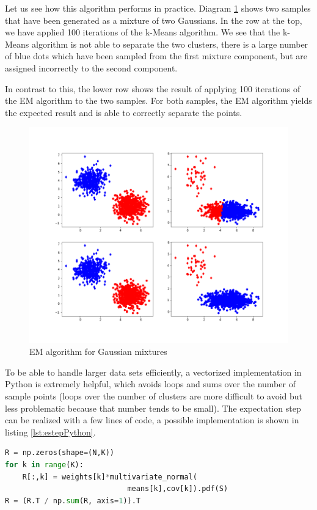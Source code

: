 \documentclass[a4paper, draft]{article}
\theoremstyle{own}
\theoremstyle{remark}
\begin{document}
Let us see how this algorithm performs in practice. Diagram \ref{fig:GMM} shows two samples that have been generated as a mixture of two Gaussians. In the row at the top, we have applied 100 iterations of the k-Means algorithm. We see that the k-Means algorithm is not able to separate the two clusters, there is a large number of blue dots which have been sampled from the first mixture component, but are assigned incorrectly to the second component.

In contrast to this, the lower row shows the result of applying 100 iterations of the EM algorithm to the two samples. For both samples, the EM algorithm yields the expected result and is able to correctly separate the points.

\begin{figure}[ht]
	\centering
	\includegraphics[width=1.0\linewidth]{GMM}
	\caption{EM algorithm for Gaussian mixtures}
	\label{fig:GMM}
\end{figure}

To be able to handle larger data sets efficiently, a vectorized implementation in Python is extremely helpful, which avoids loops and sums over the number of sample points (loops over the number of clusters are more difficult to avoid but less problematic because that number tends to be small). The expectation step can 
be realized with a few lines of code, a possible implementation is shown 
in listing \ref{lst:estepPython}.

\begin{lstlisting}[frame=single,language=Python,label=lst:estepPython, caption=Expectation step in Python]
R = np.zeros(shape=(N,K))
for k in range(K):
	R[:,k] = weights[k]*multivariate_normal(
	                        means[k],cov[k]).pdf(S)
R = (R.T / np.sum(R, axis=1)).T
\end{lstlisting}
\end{document}
